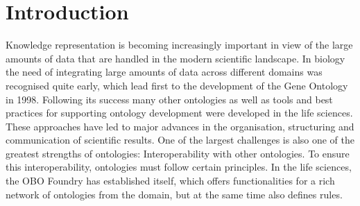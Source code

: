 \section{Introduction}
\label{introduction}

Knowledge representation is becoming increasingly important in view of the large amounts of data that are handled in the modern scientific landscape. In biology the need of integrating large amounts of data across different domains was recognised quite early, which lead first to the development of the Gene Ontology in 1998. Following its success many other ontologies as well as tools and best practices for supporting ontology development were developed in the life sciences.  These approaches have led to major advances in the organisation, structuring and communication of scientific results. %
One of the largest challenges is also one of the greatest strengths of ontologies: Interoperability with other ontologies. To ensure this interoperability, ontologies must follow certain principles. In the life sciences, the OBO Foundry has established itself, which offers functionalities for a rich network of ontologies from the domain, but at the same time also defines rules.

